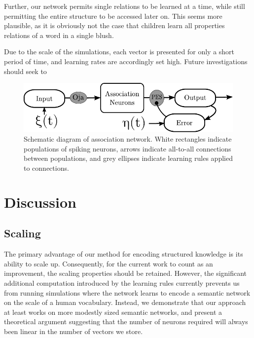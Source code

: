 \documentclass[10pt,letterpaper]{article}
\begin{document}
Further, our network permits single relations to be learned at a time, while still permitting the entire structure to be accessed later on. This seems more plausible, as it is obviously not the case that children learn all properties relations of a word in a single blush.

Due to the scale of the simulations, each vector is presented for only a short period of time, and learning rates are accordingly set high. Future investigations should seek to 


\begin{figure}[ht]
\begin{center}
\includegraphics[width=\textwidth]{../diagrams/schematic.pdf}
\end{center}
\caption{Schematic diagram of association network. White rectangles indicate populations of spiking neurons, arrows indicate all-to-all connections between populations, and grey ellipses indicate learning rules applied to connections.}
\label{fig:schematic}
\end{figure}

\section{Discussion}

\subsection{Scaling}
The primary advantage of our method for encoding structured knowledge is its ability to scale up. Consequently, for the current work to count as an improvement, the scaling properties should be retained. However, the significant additional computation introduced by the learning rules currently prevents us from running simulations where the network learns to encode a semantic network on the scale of a human vocabulary. Instead, we demonstrate that our approach at least works on more modestly sized semantic networks, and present a theoretical argument suggesting that the number of neurons required will always been linear in the number of vectors we store. 
\end{document}
